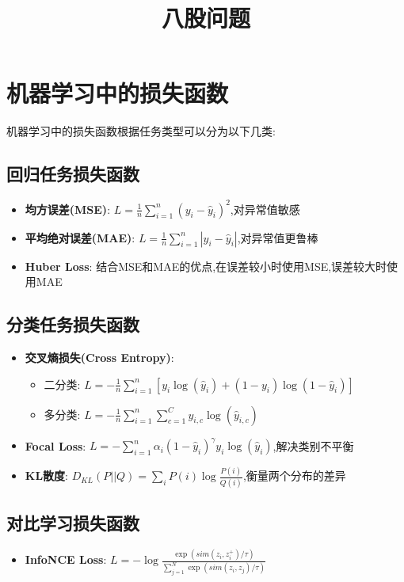 \documentclass[UTF8]{ctexart}
\title{八股问题}
\author{}
\date{}
\begin{document}
\maketitle
\section{机器学习中的损失函数}

机器学习中的损失函数根据任务类型可以分为以下几类:

\subsection{回归任务损失函数}
\begin{itemize}
    \item \textbf{均方误差(MSE)}: $L = \frac{1}{n}\sum_{i=1}^{n}(y_i - \hat{y}_i)^2$,对异常值敏感
    \item \textbf{平均绝对误差(MAE)}: $L = \frac{1}{n}\sum_{i=1}^{n}|y_i - \hat{y}_i|$,对异常值更鲁棒
    \item \textbf{Huber Loss}: 结合MSE和MAE的优点,在误差较小时使用MSE,误差较大时使用MAE
\end{itemize}

\subsection{分类任务损失函数}
\begin{itemize}
    \item \textbf{交叉熵损失(Cross Entropy)}:
    \begin{itemize}
        \item 二分类: $L = -\frac{1}{n}\sum_{i=1}^{n}[y_i\log(\hat{y}_i) + (1-y_i)\log(1-\hat{y}_i)]$
        \item 多分类: $L = -\frac{1}{n}\sum_{i=1}^{n}\sum_{c=1}^{C}y_{i,c}\log(\hat{y}_{i,c})$
    \end{itemize}
    \item \textbf{Focal Loss}: $L = -\sum_{i=1}^{n}\alpha_i(1-\hat{y}_i)^{\gamma}y_i\log(\hat{y}_i)$,解决类别不平衡
    \item \textbf{KL散度}: $D_{KL}(P||Q) = \sum_{i}P(i)\log\frac{P(i)}{Q(i)}$,衡量两个分布的差异
\end{itemize}

\subsection{对比学习损失函数}
\begin{itemize}
    \item \textbf{InfoNCE Loss}: $L = -\log\frac{\exp(sim(z_i, z_i^+)/\tau)}{\sum_{j=1}^{N}\exp(sim(z_i, z_j)/\tau)}$
\end{itemize}
\end{document}
